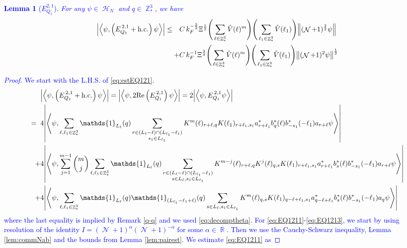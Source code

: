 \documentclass[sn-mathphys, Numbered ,a4paper]{sn-jnl}%
\DeclareMathOperator{\R}{\mathbb{R}}
\DeclareMathOperator{\Z}{\mathbb{Z}}
\DeclareMathOperator{\HH}{\mathcal{H}}
\DeclareMathOperator{\NN}{\mathcal{N}}
\newcommand{\half}{\frac{1}{2}}
\newcommand{\eva}[1]{\left\langle #1 \right\rangle}
\theoremstyle{plain}
\newtheorem{lemma}[theorem]{Lemma}
\theoremstyle{definition}
\theoremstyle{remark}
\theoremstyle{plain}
\theoremstyle{definition}
\theoremstyle{remark}
\begin{document}
\textcolor{blue}{\begin{lemma}[$E_{Q_1}^{2,1}$] \label{lem:EQ121}
For any $\psi \in \HH_N$ and $q \in \Z^3_*$, we have
\begin{alignat}{2}
	\abs{\eva{\psi,\left(E^{\,2,1}_{Q_1}+\mathrm{h.c.}\right) \psi }}\nonumber
	 \leq \quad &C\,  k_{F}^{-\frac{3}{2}} \Xi^\half \Bigg(\sum\limits_{\ell \in \Z^3_*} \hat{V}(\ell)^m\Bigg)\Bigg( \sum\limits_{\ell_1 \in \Z^3_*} \hat{V}(\ell_1) \Bigg) \norm { (\NN+1)^{\frac{3}{2}} \psi }\\
	\quad+ &C\, k_{F}^{-1}\Xi^{\frac{3}{4}} \Bigg(\sum\limits_{\ell \in \Z^3_*} \hat{V}(\ell)^m\Bigg) \Bigg(\sum\limits_{\ell_1 \in \Z^3_*} \hat{V}(\ell_1) \Bigg)  \norm{ (\NN+1)^2\psi}^\half\label{eq:estEQ121}
\end{alignat}
\end{lemma}
\begin{proof}
We start with the L.H.S. of \eqref{eq:estEQ121}.
\begin{align}
	&\abs{\eva{\psi,\left(E^{\,2,1}_{Q_1}+\mathrm{h.c.}\right) \psi }} = \abs{\eva{\psi,2\mathrm{Re}\left(E^{\,2,1}_{Q_1}\right) \psi }} = 2\abs{\eva{\psi, E^{\,2,1}_{Q_1} \psi }}\nonumber\\
	=\;\;&4  \abs{\eva{\psi, \sum\limits_{\ell, \ell_1\in \Z^3_*} \mathds{1}_{L_{\ell}}(q) \sum\limits_{\substack{r\in (L_{\ell}-\ell) \cap (L_{\ell_1}-\ell_1)\\ s_1\in L_{\ell_1} }} K^m(\ell )_{r+\ell,q}K(\ell_1)_{r+\ell_1,s_1}
	a^*_{r+\ell_1} b^*_{q}(\ell) b^*_{-s_1}(-\ell_1)a_{r+\ell} \psi }} \label{eq:EQ1211}\\
	\;+&4   \abs{\eva{\psi, \sum\limits_{j=1}^{m-1} {{m}\choose j} \sum\limits_{\ell, \ell_1\in \Z^3_*}\mathds{1}_{L_{\ell}}(q) \sum\limits_{\substack{r\in (L_{\ell}-\ell) \cap (L_{\ell_1}-\ell_1)\\ s \in L_{\ell},s_1\in L_{\ell_1} }} K^{m-j}(\ell)_{r+\ell,q} K^{j}(\ell)_{q,s} K(\ell_1)_{r+\ell_1,s_1} a^*_{r+\ell_1} b^*_{s}(\ell) b^*_{-s_1}(-\ell_1) a_{r+\ell} \psi }} \label{eq:EQ1212}\\
	\;+&4\abs{\eva{\psi, \sum\limits_{\ell, \ell_1\in \Z^3_*} \mathds{1}_{L_{\ell}}(q) \mathds{1}_{(L_{\ell_1}-\ell_1+\ell)}(q) \sum\limits_{s \in L_{\ell},s_1\in L_{\ell_1}}  K^m(\ell)_{q,s} K(\ell_1)_{q-\ell+\ell_1,s_1} a^*_{q-\ell+\ell_1} b^*_{s}(\ell) b^*_{-s_1}(-\ell_1) a_{q} \psi }}\label{eq:EQ1213}
\end{align}
where the last equality is implied by Remark \ref{q-q} and we used \eqref{eq:decomptheta}.
For \eqref{eq:EQ1211}-\eqref{eq:EQ1213}, we start by using resolution of the identity $I = (\NN+1)^{\alpha}(\NN+1)^{-\alpha}$ for some $\alpha \in \R$. Then we use the Cauchy-Schwarz inequality, Lemma \ref{lem:commNab} and the bounds from Lemma \ref{lem:pairest}. We estimate \eqref{eq:EQ1211} as

\end{proof}}
\end{document}
